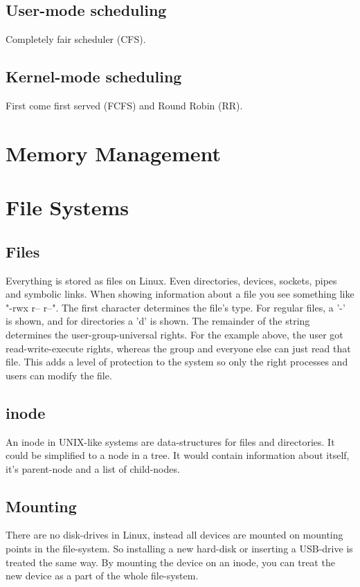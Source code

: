 \documentclass[12pt]{article}
\begin{document}
\subsection{User-mode scheduling}
Completely fair scheduler (CFS).

\subsection{Kernel-mode scheduling}
First come first served  (FCFS) and Round Robin (RR).

\section{Memory Management} %

\section{File Systems} %
\subsection{Files}
Everything is stored as files on Linux. Even directories, devices, sockets, pipes and symbolic links.
When showing information about a file you see something like "-rwx r-- r--". 
The first character determines the file's type. For regular files, a '-' is shown, and for directories a 'd' is shown. 
The remainder of the string determines the user-group-universal rights. 
For the example above, the user got read-write-execute rights, whereas the group and everyone else can just read that file.
This adds a level of protection to the system so only the right processes and users can modify the file.

\subsection{inode}
An inode in UNIX-like systems are data-structures for files and directories. 
It could be simplified to a node in a tree. It would contain information about itself, it's parent-node and a list of child-nodes.

\subsection{Mounting}
There are no disk-drives in Linux, instead all devices are mounted on mounting points in the file-system. 
So installing a new hard-disk or inserting a USB-drive is treated the same way.
By mounting the device on an inode, you can treat the new device as a part of the whole file-system.
\end{document}
